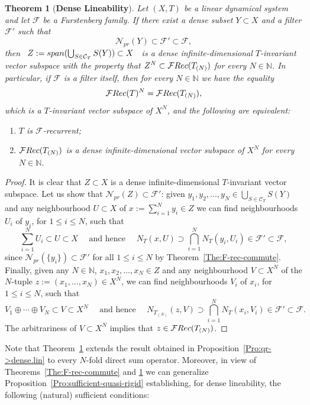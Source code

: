 \documentclass[openright,11pt]{article}
\theoremstyle{plain}
\newtheorem{theorem}{Theorem}[section]
\theoremstyle{definition}
\newcommand{\NN}{\mathbb{N}}
\newcommand{\Fc}{\mathcal{F}}
\newcommand{\Nc}{\mathcal{N}}
\newcommand{\Rec}{\textup{Rec}}
\newcommand{\Com}{\mathcal{C}}
\newcommand{\lspan}{\textup{span}}
\begin{document}
\begin{theorem}[\textbf{Dense Lineability}]\label{The:dense.lineability}
	Let $(X,T)$ be a linear dynamical system and let $\Fc$ be a Furstenberg family. If there exist a dense subset $Y \subset X$ and a filter $\Fc'$ such that
	\[
	\Nc_{pr}(Y) \subset \Fc' \subset \Fc,
	\]
	then \ $Z:=\lspan( \bigcup_{S\in\Com_T} S(Y) ) \subset X$ \ is a dense infinite-dimensional $T$-invariant vector subspace with the property that $Z^N \subset \Fc\Rec(T_{(N)})$ for every $N \in \NN$. In particular, if $\Fc$ is a filter itself, then for every $N \in \NN$ we have the equality
	\[
	\Fc\Rec(T)^N = \Fc\Rec(T_{(N)}),
	\]
	which is a $T$-invariant vector subspace of $X^N$, and the following are equivalent:
	\begin{enumerate}[{\em(i)}]
		\item $T$ is $\Fc$-recurrent;
		
		\item $\Fc\Rec(T_{(N)})$ is a dense infinite-dimensional vector subspace of $X^N$ for every $N \in \NN$.
	\end{enumerate}
\end{theorem}
\begin{proof}
	It is clear that $Z \subset X$ is a dense infinite-dimensional $T$-invariant vector subspace. Let us show that $\Nc_{pr}(Z) \subset \Fc'$: given $y_1,y_2,...,y_N \in \bigcup_{S\in\Com_T} S(Y)$ and any neighbourhood $U \subset X$ of $x:=\sum_{i=1}^N y_i \in Z$ we can find neighbourhoods $U_i$ of $y_i$, for $1\leq i\leq N$, such that
	\[
	\sum_{i=1}^N U_i \subset U \subset X \quad \text{ and hence } \quad N_{T}(x,U) \supset \bigcap_{i=1}^N N_T(y_i,U_i) \in \Fc' \subset \Fc,
	\]
	since $\Nc_{pr}(\{y_i\}) \subset \Fc'$ for all $1\leq i\leq N$ by Theorem~\ref{The:F-rec-commute}. Finally, given any $N \in \NN$, $x_1,x_2,...,x_N \in Z$ and any neighbourhood $V \subset X^N$ of the $N$-tuple $z:=(x_1,...,x_N) \in X^N$, we can find neighbourhoods $V_i$ of $x_i$, for $1\leq i\leq N$, such that
	\[
	V_1\oplus\cdots\oplus V_N \subset V \subset X^N \quad \text{ and hence } \quad  N_{T_{(N)}}(z,V) \supset \bigcap_{i=1}^N N_T(x_i,V_i) \in \Fc' \subset \Fc.
	\]
	The arbitrariness of $V \subset X^N$ implies that $z \in \Fc\Rec(T_{(N)})$.
\end{proof}

Note that Theorem~\ref{The:dense.lineability} extends the result obtained in Proposition~\ref{Pro:qr->dense.lin} to every $N$-fold direct sum operator. Moreover, in view of Theorems~\ref{The:F-rec-commute} and \ref{The:dense.lineability} we can generalize Proposition~\ref{Pro:sufficient-quasi-rigid} establishing, for dense lineability, the following (natural) sufficient conditions:
\end{document}

